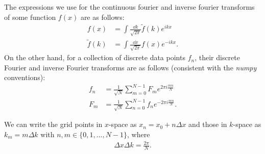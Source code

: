 The expressions we use for the continuous fourier and inverse fourier transforms of some function $f(x)$ are as follows:
\begin{align}
    f(x) &= \int \frac{\dd{k}}{\sqrt{2 \pi}} \tilde{f}(k) e^{i k x} \\
    \tilde{f}(k) &= \int \frac{\dd{x}}{\sqrt{2 \pi}} f(x) e^{-ikx}
.\end{align}
On the other hand, for a collection of discrete data points $f_{n}$, their discrete Fourier and inverse Fourier transforms are as follows (consistent with the \textit{numpy} conventions):
\begin{align}
    f_{n} &= \frac{1}{\sqrt{N}} \sum_{m=0}^{N-1} F_{m} e^{2 \pi i \frac{m n}{N}} \\
    F_{m} &= \frac{1}{\sqrt{N}} \sum_{n=0}^{N-1} f_{n} e^{-2 \pi i \frac{m n}{N}}
.\end{align}

We can write the grid points in $x$-space as $x_{n} = x_0 + n \Delta x$ and those in $k$-space as $k_{m} = m \Delta k$ with $n,m \in \{ 0,1,\ldots,N-1 \}$, where
\begin{align}
    \Delta x \Delta k = \frac{2 \pi}{N}
.\end{align}


    


